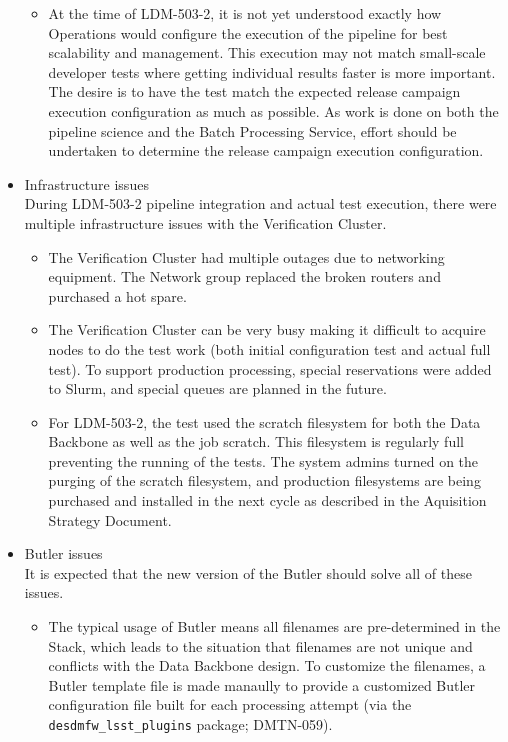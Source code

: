 \documentclass[DM,lsstdraft,STR,toc]{lsstdoc}
\begin{document}
\begin{itemize}
\begin{itemize}
  \item At the time of LDM-503-2, it is not yet understood exactly
  how Operations would configure the execution of the pipeline for 
  best scalability and management.  This execution may not match 
  small-scale developer tests where getting individual results 
  faster is more important.  The desire is to have the
  test match the expected release campaign execution configuration
  as much as possible.   As work is done on both the pipeline 
  science and the Batch Processing Service, effort should be
  undertaken to determine the release campaign execution
  configuration.
\end{itemize}
  \item Infrastructure issues \\
  During LDM-503-2 pipeline integration and actual test execution,
  there were multiple infrastructure issues with the Verification
  Cluster.
  \begin{itemize}
    \item The Verification Cluster had multiple outages due to
networking equipment.    The Network group replaced the
broken routers and purchased a hot spare.
    \item The Verification Cluster can be very busy making it
difficult to acquire nodes to do the test work (both initial
configuration test and actual full test).  To support production 
processing, special reservations were added to Slurm, and special 
queues are planned in the future.
    \item For LDM-503-2, the test used the scratch filesystem
for both the Data Backbone as well as the job scratch.  This
filesystem is regularly full preventing the running of the 
tests.   The system admins turned on the purging of the scratch 
filesystem, and production filesystems are being purchased
and installed in the next cycle as described in the Aquisition 
Strategy Document. 
  \end{itemize}

  \item Butler issues \\
    It is expected that the new version of the Butler should
    solve all of these issues.
    \begin{itemize}
    \item The typical usage of Butler means all filenames are
	  pre-determined in the Stack, which leads to the situation
	  that filenames are not unique and conflicts with the 
	  Data Backbone design.   To customize the filenames, 
      a Butler template file is made manaully to provide a 
      customized Butler configuration file built for each 
      processing attempt (via
	  the \texttt{desdmfw{\_}lsst{\_}plugins} package; DMTN-059).


\end{itemize}
\end{itemize}
\end{document}
